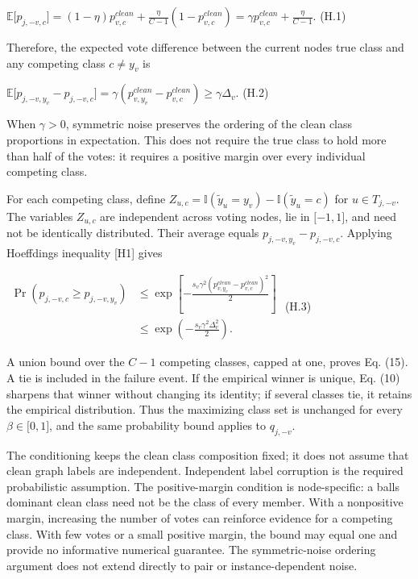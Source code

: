 \(\mathbb{E}\lbrack p_{j, - v,c}\rbrack = (1 - \eta)p_{v,c}^{clean} + \frac{\eta}{C - 1}(1 - p_{v,c}^{clean}) = \gamma p_{v,c}^{clean} + \frac{\eta}{C - 1}.\) (H.1)

Therefore, the expected vote difference between the current node\textquotesingle s true class and any competing class \(c \neq y_{v}\) is

\(\mathbb{E}\lbrack p_{j, - v,y_{v}} - p_{j, - v,c}\rbrack = \gamma(p_{v,y_{v}}^{clean} - p_{v,c}^{clean}) \geq \gamma\Delta_{v}.\) (H.2)

When \(\gamma > 0\), symmetric noise preserves the ordering of the clean class proportions in expectation. This does not require the true class to hold more than half of the votes: it requires a positive margin over every individual competing class.

For each competing class, define \(Z_{u,c} = \mathbb{I}({\widetilde{y}}_{u} = y_{v}) - \mathbb{I}({\widetilde{y}}_{u} = c)\) for \(u \in T_{j, - v}\). The variables \(Z_{u,c}\) are independent across voting nodes, lie in \(\lbrack - 1,1\rbrack\), and need not be identically distributed. Their average equals \(p_{j, - v,y_{v}} - p_{j, - v,c}\). Applying Hoeffding\textquotesingle s inequality {[}H1{]} gives

\(\begin{aligned}
\Pr(p_{j, - v,c} \geq p_{j, - v,y_{v}}) & \leq \exp\left\lbrack - \frac{s_{v}\gamma^{2}(p_{v,y_{v}}^{clean} - p_{v,c}^{clean})^{2}}{2} \right\rbrack \\
 & \leq \exp\left( - \frac{s_{v}\gamma^{2}\Delta_{v}^{2}}{2} \right).
\end{aligned}\) (H.3)

A union bound over the \(C - 1\) competing classes, capped at one, proves Eq. (15). A tie is included in the failure event. If the empirical winner is unique, Eq. (10) sharpens that winner without changing its identity; if several classes tie, it retains the empirical distribution. Thus the maximizing class set is unchanged for every \(\beta \in \lbrack 0,1\rbrack\), and the same probability bound applies to \(q_{j, - v}\).

The conditioning keeps the clean class composition fixed; it does not assume that clean graph labels are independent. Independent label corruption is the required probabilistic assumption. The positive-margin condition is node-specific: a ball\textquotesingle s dominant clean class need not be the class of every member. With a nonpositive margin, increasing the number of votes can reinforce evidence for a competing class. With few votes or a small positive margin, the bound may equal one and provide no informative numerical guarantee. The symmetric-noise ordering argument does not extend directly to pair or instance-dependent noise.

